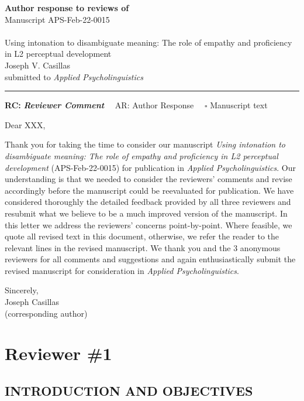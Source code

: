 \documentclass[]{article}
\begin{document}
{\Large\bf Author response to reviews of}\\[1em]
Manuscript APS-Feb-22-0015\\ \\
{\Large Using intonation to disambiguate meaning: The role of empathy and proficiency in L2 perceptual development}\\[1em]
{Joseph V. Casillas}\\
{submitted to \it Applied Psycholinguistics }\\
\hrule

\hfill {\bfseries RC:} \textbf{\textit{Reviewer Comment}}\(\quad\) AR: Author Response \(\quad\square\) Manuscript text

\vspace{2em}

Dear XXX,

Thank you for taking the time to consider our manuscript \emph{Using intonation to disambiguate meaning: The role of empathy and proficiency in L2 perceptual development
} (APS-Feb-22-0015) for publication in \emph{Applied Psycholinguistics}.
Our understanding is that we needed to consider the reviewers' comments and revise accordingly before the manuscript could be reevaluated for publication.
We have considered thoroughly the detailed feedback provided by all three reviewers and resubmit what we believe to be a much improved version of the manuscript.
In this letter we address the reviewers' concerns point-by-point.
Where feasible, we quote all revised text in this document, otherwise, we refer the reader to the relevant lines in the revised manuscript.
We thank you and the 3 anonymous reviewers for all comments and suggestions and again enthusiastically submit the revised manuscript for consideration in \emph{Applied Psycholinguistics}.

Sincerely,\\
Joseph Casillas\\
(corresponding author)

\clearpage

\hypertarget{reviewer-1}{%
\section{Reviewer \#1}\label{reviewer-1}}

\hypertarget{introduction-and-objectives}{%
\subsection{INTRODUCTION AND OBJECTIVES}\label{introduction-and-objectives}}
\end{document}
